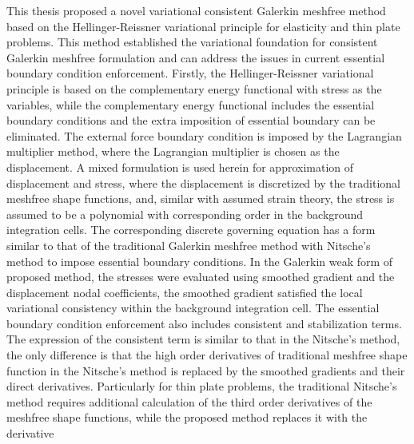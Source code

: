 \begin{abstractEn}
This thesis proposed a novel variational consistent Galerkin meshfree method based on the Hellinger-Reissner variational principle for elasticity and thin plate problems. This method established the variational foundation for consistent Galerkin meshfree formulation and can address the issues in current essential boundary condition enforcement.
Firstly, the Hellinger-Reissner variational principle is based on the complementary energy functional with stress as the variables, while the complementary energy functional includes the essential boundary conditions and the extra imposition of essential boundary can be eliminated.
The external force boundary  condition is imposed by the Lagrangian multiplier method, where the Lagrangian multiplier is chosen as the displacement.
A mixed formulation is used herein for approximation of displacement and stress, where the displacement is discretized by the traditional meshfree shape functions, and, similar with assumed strain theory, the stress is assumed to be a polynomial with corresponding order in the background integration cells.
The corresponding discrete governing equation has a form similar to that of the traditional Galerkin meshfree method with Nitsche's method to impose essential boundary conditions.
In the Galerkin weak form of proposed method, the stresses were evaluated using smoothed gradient and the displacement nodal coefficients, the smoothed gradient satisfied the local variational consistency within the background integration cell.
The essential boundary condition enforcement also includes consistent and stabilization terms. The expression of the consistent term is similar to that in the Nitsche's method, the only difference is that the high order derivatives of traditional meshfree shape function in the Nitsche's method is replaced by the smoothed gradients and their direct derivatives.
Particularly for thin plate problems, the traditional Nitsche's method requires additional calculation of the third order derivatives of the meshfree shape functions, while the proposed method replaces it with the derivative
\end{abstractEn}
